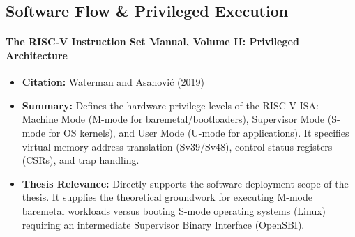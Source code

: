 \documentclass[12pt,a4paper]{article}
\begin{document}
\subsection{Software Flow \& Privileged Execution}

\paragraph{The RISC-V Instruction Set Manual, Volume II: Privileged Architecture}
\begin{itemize}
    \item \textbf{Citation:} Waterman and Asanovi\'{c} (2019) \cite{waterman2019riscv}
    \item \textbf{Summary:} Defines the hardware privilege levels of the RISC-V ISA: Machine Mode (M-mode for baremetal/bootloaders), Supervisor Mode (S-mode for OS kernels), and User Mode (U-mode for applications). It specifies virtual memory address translation (Sv39/Sv48), control status registers (CSRs), and trap handling.
    \item \textbf{Thesis Relevance:} Directly supports the software deployment scope of the thesis. It supplies the theoretical groundwork for executing M-mode baremetal workloads versus booting S-mode operating systems (Linux) requiring an intermediate Supervisor Binary Interface (OpenSBI).
\end{itemize}
\end{document}
